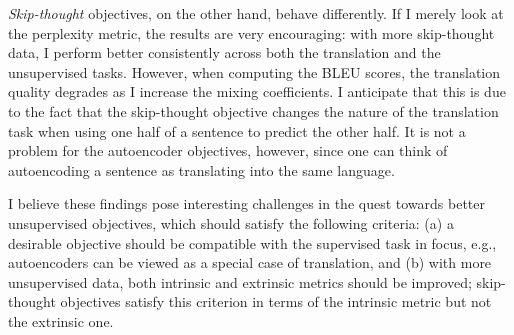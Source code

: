 {\it Skip-thought} objectives, on the other hand, behave differently. If I
merely look at the perplexity metric, the results are very encouraging: with
more skip-thought data, I perform better consistently across both the
translation and the unsupervised tasks. However, when computing the BLEU scores,
the translation quality degrades as I increase the mixing coefficients. I anticipate that
this is due to the fact that the skip-thought objective changes the nature of
the translation task when using one half of a sentence to predict the other
half. It is not a problem for the autoencoder objectives, however, since one can
think of autoencoding a sentence as translating into the same language.

I believe these findings pose interesting challenges in the quest towards  better
unsupervised objectives, which should satisfy the following criteria: (a)
a desirable objective should be compatible with the supervised task in focus, e.g.,
autoencoders can be viewed as a special case of translation,
and (b) with more unsupervised data, both intrinsic and extrinsic metrics
should be improved; skip-thought objectives satisfy this criterion in terms of
the intrinsic metric but not the extrinsic one.



